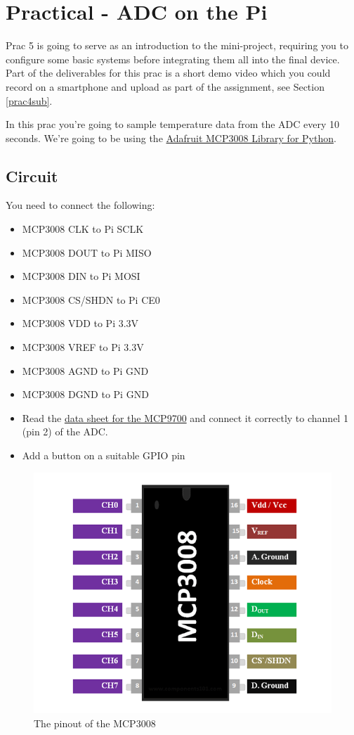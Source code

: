 \section{Practical - ADC on the Pi}
Prac 5 is going to serve as an introduction to the mini-project, requiring you to configure some basic systems before integrating them all into the final device. Part of the deliverables for this prac is a short demo video which you could record on a smartphone and upload as part of the assignment, see Section \ref{prac4sub}.

In this prac you're going to sample temperature data from the ADC every 10 seconds. We're going to be using the \href{https://learn.adafruit.com/mcp3008-spi-adc/python-circuitpython}{Adafruit MCP3008 Library for Python}.

\subsection{Circuit}
You need to connect the following:
\begin{itemize}
    \item MCP3008 CLK to Pi SCLK
    \item MCP3008 DOUT to Pi MISO
    \item MCP3008 DIN to Pi MOSI
    \item MCP3008 CS/SHDN to Pi CE0
    \item MCP3008 VDD to Pi 3.3V
    \item MCP3008 VREF to Pi 3.3V
    \item MCP3008 AGND to Pi GND
    \item MCP3008 DGND to Pi GND
    \item Read the \href{http://ww1.microchip.com/downloads/en/DeviceDoc/20001942G.pdf}{data sheet for the MCP9700} and connect it correctly to channel 1 (pin 2) of the ADC.
    \item Add a button on a suitable GPIO pin
\end{itemize}

\begin{figure}[H]
\centering
\includegraphics[width=0.6\columnwidth]{Figures/MCP3008Pinout}
\caption{The pinout of the MCP3008}
\end{figure}

